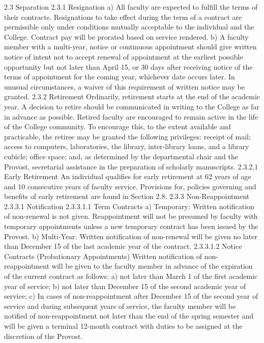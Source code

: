 \documentclass[letterpaper, 11pt]{article}
\begin{document}
2.3 Separation
2.3.1 Resignation
a) All faculty are expected to fulfill the terms of their contracts.  Resignations to take effect during the term of a contract are permissible only under conditions mutually acceptable to the individual and the College.  Contract pay will be prorated based on service rendered.
b) A faculty member with a multi-year, notice or continuous appointment should give written notice of intent not to accept renewal of appointment at the earliest possible opportunity but not later than April 15, or 30 days after receiving notice of the terms of appointment for the coming year, whichever date occurs later. In unusual circumstances, a waiver of this requirement of written notice may be granted.
2.3.2 Retirement
   Ordinarily, retirement starts at the end of the academic year.  A decision to retire should be communicated in writing to the College as far in advance as possible.  Retired faculty are encouraged to remain active in the life of the College community.  To encourage this, to the extent available and practicable, the retiree may be granted the following privileges:  receipt of mail; access to computers, laboratories, the library, inter-library loans, and a library cubicle; office space; and, as determined by the departmental chair and the Provost, secretarial assistance in the preparation of scholarly manuscripts.
2.3.2.1 Early Retirement
   An individual qualifies for early retirement at 62 years of age and 10 consecutive years of faculty service.  Provisions for, policies governing and benefits of early retirement are found in Section 2.8.
2.3.3 Non-Reappointment
2.3.3.1 Notification
2.3.3.1.1 Term Contracts
a) Temporary: Written notification of non-renewal is not given.  Reappointment will not be presumed by faculty with temporary appointments unless a new temporary contract has been issued by the Provost.
b) Multi-Year: Written notification of non-renewal will be given no later than December 15 of the last academic year of the contract.
2.3.3.1.2 Notice Contracts (Probationary Appointments)
   Written notification of non-reappointment will be given to the faculty member in advance of the expiration of the current contract as follows:
a) not later than March 1 of the first academic year of service;
b) not later than December 15 of the second academic year of service;
c) In cases of non-reappointment after December 15 of the second year of service and during subsequent years of service, the faculty member will be notified of non-reappointment not later than the end of the spring semester and will be given a terminal 12-month contract with duties to be assigned at the discretion of the Provost. 
\end{document}
